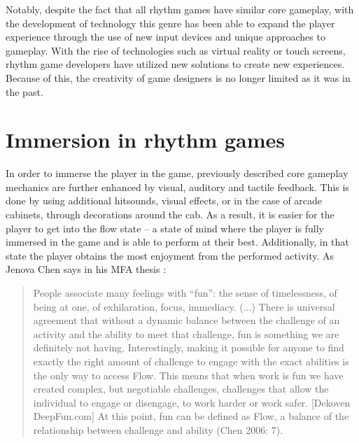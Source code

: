 Notably, despite the fact that all rhythm games have similar core gameplay, with the development of technology this genre has been able to expand the player experience through the use of new input devices and unique approaches to gameplay. With the rise of technologies such as virtual reality or touch screens, rhythm game developers have utilized new solutions to create new experiences. Because of this, the creativity of game designers is no longer limited as it was in the past.

\section{Immersion in rhythm games}
In order to immerse the player in the game, previously described core gameplay mechanics are further enhanced by visual, auditory and tactile feedback. This is done by using additional hitsounds, visual effects, or in the case of arcade cabinets, through decorations around the cab. As a result, it is easier for the player to get into the flow state -- a state of mind where the player is fully immersed in the game and is able to perform at their best. Additionally, in that state the player obtains the most enjoyment from the performed activity. As Jenova Chen says in his MFA thesis \cite{chen2006flow}:
\begin{quote}
    People associate many feelings with “fun”: the sense of timelessness, of being at one, of exhilaration, focus, immediacy. (...) There is universal agreement that without a dynamic balance between the challenge of an activity and the ability to meet that challenge, fun is something we are definitely not having. Interestingly, making it possible for anyone to find exactly the right amount of challenge to engage with the exact abilities is the only way to access Flow. This means that when work is fun we have created complex, but negotiable challenges, challenges that allow the individual to engage or disengage, to work harder or work safer. [Dekoven DeepFun.com] At this point, fun can be defined as Flow, a balance of the relationship between challenge and ability (Chen 2006: 7).
\end{quote} 

